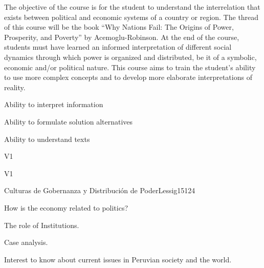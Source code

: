 \begin{syllabus}


\begin{justification}
The objective of the course is for the student to understand the interrelation that exists between political and economic systems of a country or region. The thread of this course will be the book “Why Nations Fail: The Origins of Power, Prosperity, and Poverty” by Acemoglu-Robinson.
At the end of the course, students must have learned an informed interpretation of different social dynamics through which power is organized and distributed, be it of a symbolic, economic and/or political nature. This course aims to train the student’s ability to use more complex concepts and to develop more elaborate interpretations of reality. 
\end{justification}

\begin{goals}
\item Ability to interpret information
\item Ability to formulate solution alternatives
\item Ability to understand texts 
\end{goals}

\begin{outcomes}{V1}
    \item {}
    \item {}
    \item {}
    
\end{outcomes}

\begin{competences}{V1}
    \item {}
    \item {}
    \item {}
    \item {}
\end{competences}

\begin{unit}{Culturas de Gobernanza y Distribución de Poder}{}{Lessig15}{12}{4}
   \begin{topics}
      \item How is the economy related to politics?
      \item The role of Institutions.
      \item Case analysis.
   \end{topics}
   \begin{learningoutcomes}
      \item Interest to know about current issues in Peruvian society and the world.
   \end{learningoutcomes}
\end{unit}

\begin{coursebibliography}
\end{coursebibliography}

\end{syllabus}
